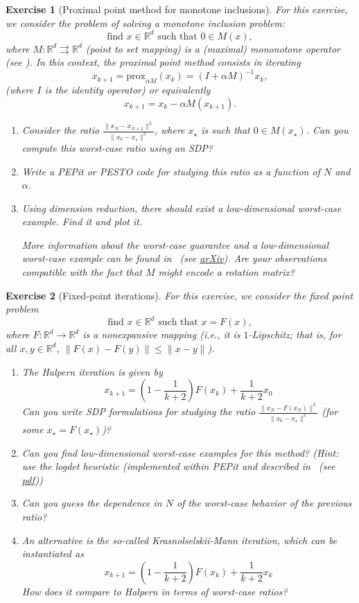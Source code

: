 \documentclass[11pt,a4paper]{article}
\newcommand{\pesto}{{PESTO }}
\newcommand{\pepit}{{PEPit }}
\newtheorem{exercise}{Exercise}
\begin{document}
\begin{exercise}[Proximal point method for monotone inclusions]\label{ex:ppm2}
	For this exercise, we consider the problem of solving a monotone inclusion problem:
	\[ \text{find } x\in\mathbb{R}^d \text{ such that } 0\in M(x),\]
	where $M:\mathbb{R}^d\rightrightarrows {\mathbb{R}^d}$ (point to set mapping) is a (maximal) mononotone operator (see ). In this context, the proximal point method consists in iterating
	\[ x_{k+1}=\mathrm{prox}_{\alpha M}(x_k)=(I+\alpha M)^{-1} x_k,\]
(where $I$ is the identity operator) or equivalently 
	\[ x_{k+1}=x_k-\alpha M(x_{k+1}).\]
	\begin{enumerate}
	\item Consider the ratio $\frac{\|x_{N}-x_{N+1}\|^2}{\|x_0-x_\star\|^2}$, where $x_\star$ is such that $0\in M(x_\star)$. Can you compute this worst-case ratio using an SDP?
	\item Write a \pepit or \pesto code for studying this ratio as a function of $N$ and $\alpha$.
	\item Using dimension reduction, there should exist a low-dimensional worst-case example. Find it and plot it.
	
	More information about the worst-case guarantee and a low-dimensional worst-case example can be found in~\cite{gu2020tight} (see \href{https://arxiv.org/pdf/1904.05495.pdf}{arXiv}). Are your observations compatible with the fact that $M$ might encode a rotation matrix?
	\end{enumerate}
	\end{exercise}
	

	
	\begin{exercise}[Fixed-point iterations]\label{ex:halpern}
For this exercise, we consider the fixed point problem
	\[ \text{find } x\in\mathbb{R}^d \text{ such that } x=F(x), \]
	where $F:\mathbb{R}^d\rightarrow \mathbb{R}^d$ is a nonexpansive mapping (i.e., it is $1$-Lipschitz; that is, for all $x,y\in\mathbb{R}^d$, $\|F(x)-F(y)\|\leqslant \|x-y\|$).
	\begin{enumerate}
	\item The Halpern iteration is given by
	\[ x_{k+1} = \left(1-\frac{1}{k+2}\right)F(x_k) + \frac{1}{k+2} x_0\]
	Can you write SDP formulations for studying the ratio $\frac{\|x_{N}-F(x_N)\|^2}{\|x_0-x_\star\|^2}$ (for some $x_\star=F(x_\star)$)?
	\item Can you find low-dimensional worst-case examples for this method? (Hint: use the logdet heuristic (implemented within \pepit and described in~\cite{fazel2003log} (see \href{https://web.stanford.edu/~boyd/papers/pdf/rank_min_heur_hankel.pdf}{pdf}))
	\item Can you guess the dependence in $N$ of the worst-case behavior of the previous ratio?
	\item An alternative is the so-called Krasnolselskii-Mann iteration, which can be instantiated as
	\[ x_{k+1} = \left(1-\frac{1}{k+2}\right)F(x_k) + \frac{1}{k+2} x_k\]
	How does it compare to Halpern in terms of worst-case ratios?
	\end{enumerate}
	\end{exercise}
	
\end{document}
